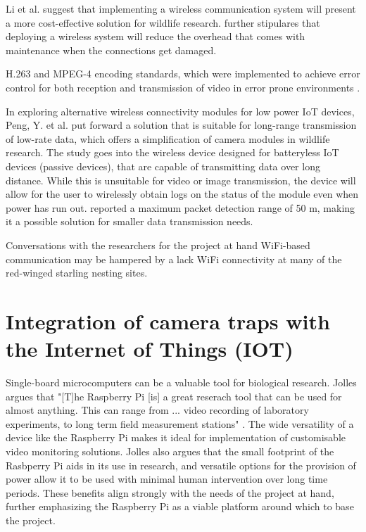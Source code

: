 \documentclass[class=report,11pt,crop=false]{standalone}
\begin{document}
Li et al. \cite{li2010design} suggest that implementing a wireless communication system will present a more cost-effective solution for wildlife research.  \cite{li2010design} further stipulares that deploying a wireless system will reduce the overhead that comes with maintenance when the connections get damaged.

\cite{adsumilli2002adaptive} H.263 and MPEG-4 encoding standards, which were implemented to achieve error control for both reception and transmission of video in error prone environments \cite{adsumilli2002adaptive}.

In exploring alternative wireless connectivity modules for low power IoT devices, Peng, Y. et al. \cite{peng2018plora} put forward a solution that is suitable for long-range transmission of low-rate data, which offers a simplification of camera modules in wildlife research. The study goes into the wireless device designed for batteryless IoT devices (passive devices), that are capable of transmitting data over long distance. While this is unsuitable for video or image transmission, the device will allow for the user to wirelessly obtain logs on the status of the module even when power has run out. \cite{peng2018plora} reported a maximum packet detection range of 50 m, making it a possible solution for smaller data transmission needs. %

Conversations with the researchers for the project at hand \cite{hofmeyer2024private} WiFi-based communication may be hampered by a lack WiFi connectivity at many of the red-winged starling nesting sites.

\section{Integration of camera traps with the Internet of Things (IOT)}

Single-board microcomputers can be a valuable tool for biological research. Jolles argues that "[T]he Raspberry Pi [is] a great reserach tool that can be used for almost anything. This can range from ... video recording of laboratory experiments, to long term field measurement stations" \cite{jolles2021broad-scale}. The wide versatility of a device like the Raspberry Pi makes it ideal for implementation of customisable video monitoring solutions. Jolles \cite{jolles2021broad-scale} also argues that the small footprint of the Rasbperry Pi aids in its use in research, and versatile options for the provision of power allow it to be used with minimal human intervention over long time periods. These benefits align strongly with the needs of the project at hand, further emphasizing the Raspberry Pi as a viable platform around which to base the project.
\end{document}
